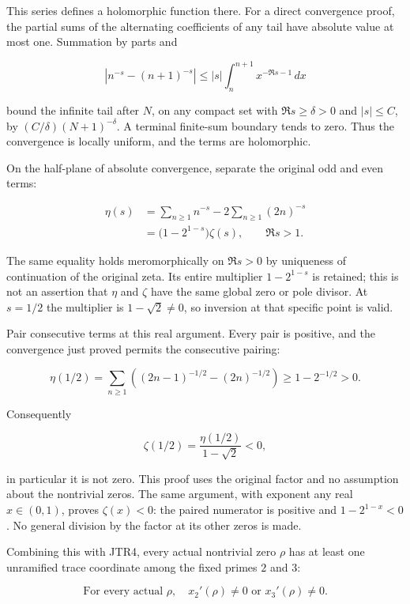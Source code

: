 \documentclass[
]{article}
\begin{document}
This series defines a holomorphic function there. For a direct
convergence proof, the partial sums of the alternating coefficients of
any tail have absolute value at most one. Summation by parts and

\[
|n^{-s}-(n+1)^{-s}|
\le |s|\int_n^{n+1}x^{-\Re s-1}\,dx
\]

bound the infinite tail after \(N\), on any compact set with
\(\Re s\ge\delta>0\) and \(|s|\le C\), by \((C/\delta)(N+1)^{-\delta}\).
A terminal finite-sum boundary tends to zero. Thus the convergence is
locally uniform, and the terms are holomorphic.

On the half-plane of absolute convergence, separate the original odd and
even terms:

\[
\begin{aligned}
\eta(s)
&=\sum_{n\ge1}n^{-s}-2\sum_{n\ge1}(2n)^{-s}\\
&=\bigl(1-2^{1-s}\bigr)\zeta(s),\qquad \Re s>1.
\end{aligned}
\tag{JTR5.2}
\]

The same equality holds meromorphically on \(\Re s>0\) by uniqueness of
continuation of the original zeta. Its entire multiplier \(1-2^{1-s}\)
is retained; this is not an assertion that \(\eta\) and \(\zeta\) have
the same global zero or pole divisor. At \(s=1/2\) the multiplier is
\(1-\sqrt2\ne0\), so inversion at that specific point is valid.

Pair consecutive terms at this real argument. Every pair is positive,
and the convergence just proved permits the consecutive pairing:

\[
\eta(1/2)
=\sum_{n\ge1}\left((2n-1)^{-1/2}-(2n)^{-1/2}\right)
\ge 1-2^{-1/2}>0.
\tag{JTR5.3}
\]

Consequently

\[
\boxed{\zeta(1/2)=\frac{\eta(1/2)}{1-\sqrt2}<0,}
\tag{JTR5.4}
\]

in particular it is not zero. This proof uses the original factor and no
assumption about the nontrivial zeros. The same argument, with exponent
any real \(x\in(0,1)\), proves \(\zeta(x)<0\): the paired numerator is
positive and \(1-2^{1-x}<0\). No general division by the factor at its
other zeros is made.

Combining this with JTR4, every actual nontrivial zero \(\rho\) has at
least one unramified trace coordinate among the fixed primes \(2\) and
\(3\):

\[
\boxed{\text{For every actual }\rho,
\quad x_2'(\rho)\ne0\text{ or }x_3'(\rho)\ne0.}
\tag{JTR5.5}
\]
\end{document}
